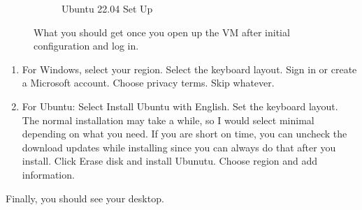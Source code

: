 \begin{figure}[hbt!]
\begin{subfigure}[b]{0.45\textwidth}
          \caption{Ubuntu 22.04 Set Up}
          \label{fig:VM_Ubuntu2}
      \end{subfigure}
      \caption{What you should get once you open up the VM after initial configuration and log in. }
  \end{figure}
  \begin{enumerate}
      \item For Windows, select your region. Select the keyboard layout. Sign in or create a Microsoft account. Choose privacy terms. Skip whatever. 
      \item For Ubuntu: Select Install Ubuntu with English. Set the keyboard layout. The normal installation may take a while, so I would select minimal depending on what you need. If you are short on time, you can uncheck the download updates while installing since you can always do that after you install. Click Erase disk and install Ubunutu. Choose region and add information. 
  \end{enumerate}
  Finally, you should see your desktop. 
